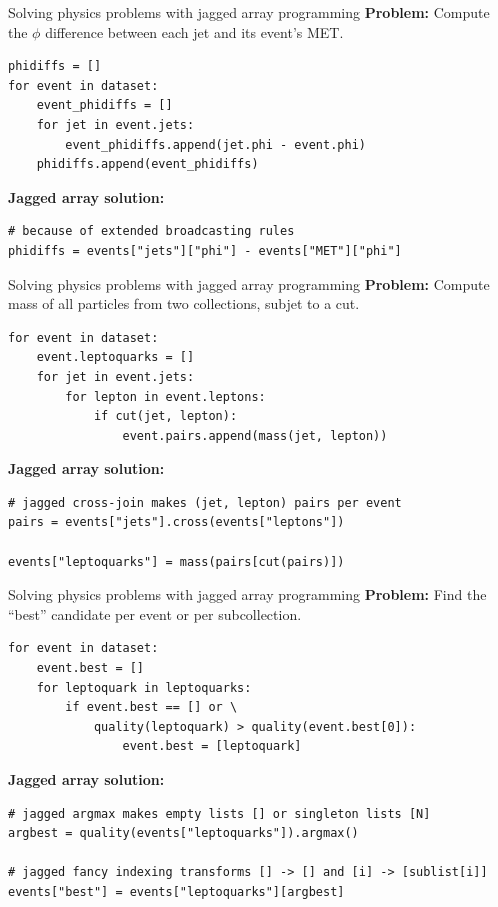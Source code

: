 \documentclass[aspectratio=169]{beamer}
\begin{document}
\begin{frame}[fragile]{Solving physics problems with jagged array programming}
\vspace{0.5 cm}
{\bf Problem:} Compute the $\phi$ difference between each jet and its event's MET.
\small
\begin{verbatim}
phidiffs = []
for event in dataset:
    event_phidiffs = []
    for jet in event.jets:
        event_phidiffs.append(jet.phi - event.phi)
    phidiffs.append(event_phidiffs)
\end{verbatim}
\normalsize

\vspace{0.5 cm}
{\bf Jagged array solution:} 
\small
\begin{verbatim}
# because of extended broadcasting rules
phidiffs = events["jets"]["phi"] - events["MET"]["phi"]
\end{verbatim}
\end{frame}

\begin{frame}[fragile]{Solving physics problems with jagged array programming}
\vspace{0.5 cm}
{\bf Problem:} Compute mass of all particles from two collections, subjet to a cut.
\small
\begin{verbatim}
for event in dataset:
    event.leptoquarks = []
    for jet in event.jets:
        for lepton in event.leptons:
            if cut(jet, lepton):
                event.pairs.append(mass(jet, lepton))
\end{verbatim}
\normalsize

\vspace{0.5 cm}
{\bf Jagged array solution:} 
\small
\begin{verbatim}
# jagged cross-join makes (jet, lepton) pairs per event
pairs = events["jets"].cross(events["leptons"])

events["leptoquarks"] = mass(pairs[cut(pairs)])
\end{verbatim}
\end{frame}

\begin{frame}[fragile]{Solving physics problems with jagged array programming}
\vspace{0.5 cm}
{\bf Problem:} Find the ``best'' candidate per event or per subcollection.
\small
\begin{verbatim}
for event in dataset:
    event.best = []
    for leptoquark in leptoquarks:
        if event.best == [] or \
            quality(leptoquark) > quality(event.best[0]):
                event.best = [leptoquark]
\end{verbatim}
\normalsize

\vspace{0.5 cm}
{\bf Jagged array solution:} 
\small
\begin{verbatim}
# jagged argmax makes empty lists [] or singleton lists [N]
argbest = quality(events["leptoquarks"]).argmax()

# jagged fancy indexing transforms [] -> [] and [i] -> [sublist[i]]
events["best"] = events["leptoquarks"][argbest]
\end{verbatim}
\end{frame}
\end{document}
